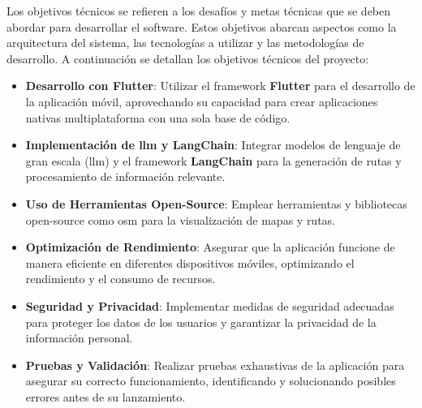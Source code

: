 Los objetivos técnicos se refieren a los desafíos y metas técnicas que se deben abordar para desarrollar el software. Estos objetivos abarcan aspectos como la arquitectura del sistema, las tecnologías a utilizar y las metodologías de desarrollo. A continuación se detallan los objetivos técnicos del proyecto:

\begin{itemize}
    \item \textbf{Desarrollo con Flutter}: Utilizar el framework \textbf{Flutter} para el desarrollo de la aplicación móvil, aprovechando su capacidad para crear aplicaciones nativas multiplataforma con una sola base de código.
    \item \textbf{Implementación de \acrfull{llm} y \textbf{LangChain}}: Integrar modelos de lenguaje de gran escala (\acrshort{llm}) y el framework \textbf{LangChain} para la generación de rutas y procesamiento de información relevante.
    \item \textbf{Uso de Herramientas Open-Source}: Emplear herramientas y bibliotecas open-source como \acrfull{osm} para la visualización de mapas y rutas.
    \item \textbf{Optimización de Rendimiento}: Asegurar que la aplicación funcione de manera eficiente en diferentes dispositivos móviles, optimizando el rendimiento y el consumo de recursos.
    \item \textbf{Seguridad y Privacidad}: Implementar medidas de seguridad adecuadas para proteger los datos de los usuarios y garantizar la privacidad de la información personal.
    \item \textbf{Pruebas y Validación}: Realizar pruebas exhaustivas de la aplicación para asegurar su correcto funcionamiento, identificando y solucionando posibles errores antes de su lanzamiento.
\end{itemize}

